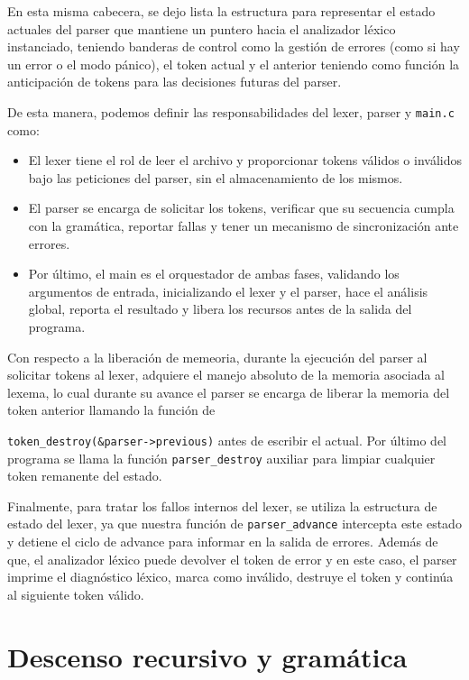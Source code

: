 \documentclass[12pt]{article}
\begin{document}
En esta misma cabecera, se dejo lista la estructura para representar el estado actuales
del parser que mantiene un puntero hacia el analizador léxico instanciado, teniendo banderas de control
como la gestión de errores (como si hay un error o el modo pánico), el token actual y el anterior
teniendo como función la anticipación de tokens para las decisiones futuras del parser.

De esta manera, podemos definir las responsabilidades del lexer, parser y \texttt{main.c}
como:

\begin{itemize}
    \item El lexer tiene el rol de leer el archivo y proporcionar tokens válidos
    o inválidos bajo las peticiones del parser, sin el almacenamiento de los mismos.
    \item El parser se encarga de solicitar los tokens, verificar que su secuencia cumpla
    con la gramática, reportar fallas y tener un mecanismo de sincronización ante errores.
    \item Por último, el main es el orquestador de ambas fases, validando los argumentos
    de entrada, inicializando el lexer y el parser, hace el análisis global, reporta el resultado
    y libera los recursos antes de la salida del programa.
\end{itemize}

Con respecto a la liberación de memeoria, durante la ejecución del parser al solicitar
tokens al lexer, adquiere el manejo absoluto de la memoria asociada al lexema, lo cual durante su 
avance el parser se encarga de liberar la memoria del token anterior llamando la 
función de 

\verb|token_destroy(&parser->previous)| antes de escribir el actual. Por último
del programa se llama la función \verb|parser_destroy| auxiliar para limpiar cualquier token remanente del estado.

Finalmente, para tratar los fallos internos del lexer, se utiliza la estructura de estado del 
lexer, ya que nuestra función de \verb|parser_advance| intercepta este estado y detiene el ciclo de advance
para informar en la salida de errores. Además de que, el analizador léxico puede devolver
el token de error y en este caso, el parser imprime el diagnóstico léxico,
marca como inválido, destruye el token y continúa al siguiente token válido.

\section{Descenso recursivo y gramática}
\end{document}
